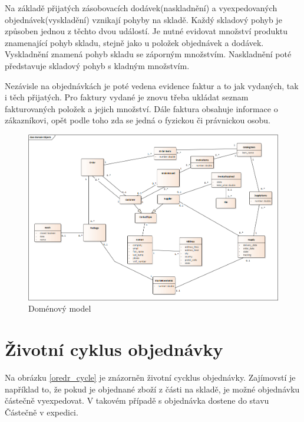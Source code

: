 \documentclass[thesis=B,czech]{FITthesis}[2012/06/26]
\begin{document}
	Na základě přijatých zásobovacích dodávek(naskladnění) a vyexpedovaných objednávek(vyskladění) vznikají pohyby na skladě. Každý skladový pohyb je způsoben jednou z těchto dvou událostí. Je nutné evidovat množství produktu znamenající pohyb skladu, stejně jako u položek objednávek a dodávek. Vyskladnění znamená pohyb skladu se záporným množstvím. Naskladnění poté představuje skladový pohyb s kladným množstvím.
	
	Nezávisle na objednávkách je poté vedena evidence faktur a to jak vydaných, tak i těch přijatých. Pro faktury vydané je znovu třeba ukládat seznam fakturovaných položek a jejich množství. Dále faktura obsahuje informace o zákazníkovi, opět podle toho zda se jedná o fyzickou či právnickou osobu. 
	
\begin{figure}
	\includegraphics[height=\textwidth, angle=90]{domain_model.png}
	\caption{Doménový model}\label{domain_model}
\end{figure}

\section{Životní cyklus objednávky}
	Na obrázku \ref{oredr_cycle} je znázorněn životní cycklus objednávky. Zajímovstí je například to, že pokud je objednané zboží z části na skladě, je možné objednávku částečně vyexpedovat. V takovém případě s objednávka dostene do stavu Částečně v expedici. 
	
\end{document}
